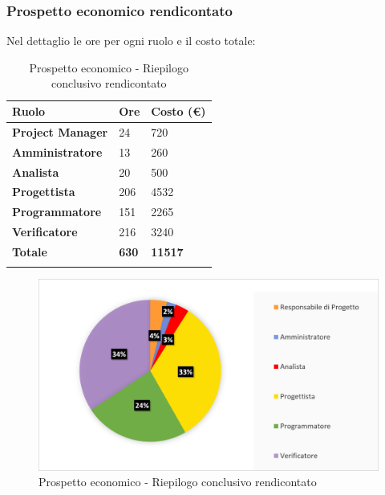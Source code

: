 \subsubsection{Prospetto economico rendicontato}
Nel dettaglio le ore per ogni ruolo e il costo totale: 
\begin{center}
	\def\arraystretch{1.6}
	\bgroup
	\begin{longtable}{| p{4cm} | p{1cm} | p{2cm} |}
		\hline
		\textbf{Ruolo} & \textbf{Ore} & \textbf{Costo (€)} \\ 
		
		\hline \hline  
		
		\textbf{Project Manager} & {24} & {720} \\ 
		\hline 
		
		\textbf{Amministratore} & {13} & {260} \\ 
		\hline 
		
		\textbf{Analista} & {20} & {500} \\ 
		\hline 
		
		\textbf{Progettista} & {206} & {4532} \\ 
		\hline 
		
		\textbf{Programmatore} & {151} & {2265} \\ 
		\hline 
		
		\textbf{Verificatore} & {216} & {3240} \\ 
		\hline 
		
		\textbf{Totale} & \textbf{630} & \textbf{11517} \\ 
		\hline 
		
		
		\hline 
		
		\caption{Prospetto economico - Riepilogo conclusivo rendicontato}
	\end{longtable}
	\egroup
\end{center}
\begin{figure}[H]
	\centering
	\includegraphics[width= 14cm]{immagini/rend_torta.png}
	\caption{Prospetto economico - Riepilogo conclusivo rendicontato}
\end{figure}
\newpage